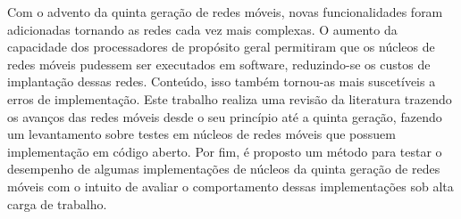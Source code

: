 Com o advento da quinta geração de redes móveis, novas funcionalidades foram adicionadas tornando as redes cada vez mais complexas.
O aumento da capacidade dos processadores de propósito geral permitiram que os núcleos de redes móveis pudessem ser executados em software, reduzindo-se os custos de implantação dessas redes. Conteúdo, isso também tornou-as mais suscetíveis a erros de implementação.
Este trabalho realiza uma revisão da literatura trazendo os avanços das redes móveis desde o seu princípio até a quinta geração, fazendo um levantamento sobre testes em núcleos de redes móveis que possuem implementação em código aberto.
Por fim, é proposto um método para testar o desempenho de algumas implementações de núcleos da quinta geração de redes móveis com o intuito de avaliar o comportamento dessas implementações sob alta carga de trabalho.
